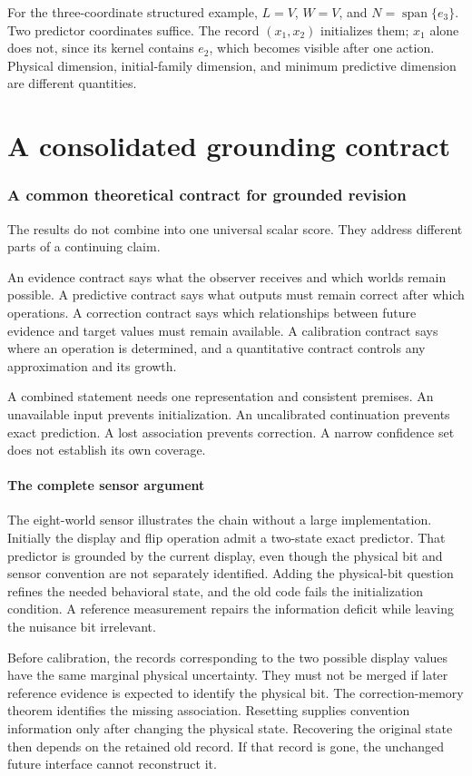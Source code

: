 \documentclass[11pt,letterpaper]{article}
\theoremstyle{plain}
\theoremstyle{definition}
\newcommand{\Span}{\operatorname{span}}\newcommand{\Pow}{\mathcal P}
\begin{document}
For the three-coordinate structured example, $L=V$, $W=V$, and $N=\Span\{e_3\}$. Two predictor coordinates suffice. The record $(x_1,x_2)$ initializes them; $x_1$ alone does not, since its kernel contains $e_2$, which becomes visible after one action. Physical dimension, initial-family dimension, and minimum predictive dimension are different quantities.

\FloatBarrier\clearpage
\part{A consolidated grounding contract}
\section{A common theoretical contract for grounded revision}\label{sec:integration}
The results do not combine into one universal scalar score. They address different parts of a continuing claim.

An evidence contract says what the observer receives and which worlds remain possible. A predictive contract says what outputs must remain correct after which operations. A correction contract says which relationships between future evidence and target values must remain available. A calibration contract says where an operation is determined, and a quantitative contract controls any approximation and its growth.

A combined statement needs one representation and consistent premises. An unavailable input prevents initialization. An uncalibrated continuation prevents exact prediction. A lost association prevents correction. A narrow confidence set does not establish its own coverage.

\subsection{The complete sensor argument}
The eight-world sensor illustrates the chain without a large implementation. Initially the display and flip operation admit a two-state exact predictor. That predictor is grounded by the current display, even though the physical bit and sensor convention are not separately identified. Adding the physical-bit question refines the needed behavioral state, and the old code fails the initialization condition. A reference measurement repairs the information deficit while leaving the nuisance bit irrelevant.

Before calibration, the records corresponding to the two possible display values have the same marginal physical uncertainty. They must not be merged if later reference evidence is expected to identify the physical bit. The correction-memory theorem identifies the missing association. Resetting supplies convention information only after changing the physical state. Recovering the original state then depends on the retained old record. If that record is gone, the unchanged future interface cannot reconstruct it.
\end{document}
